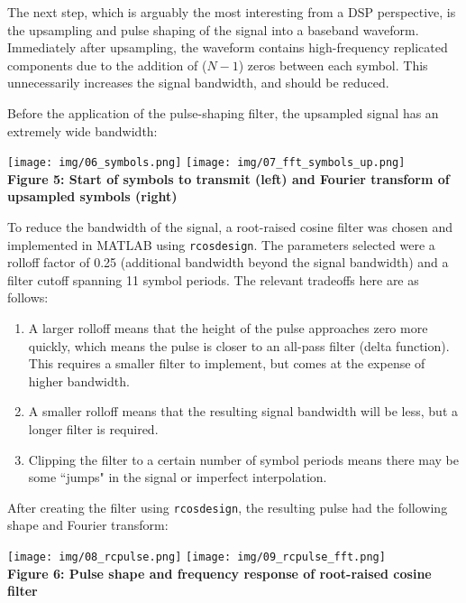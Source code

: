 \documentclass{article}
\begin{document}
The next step, which is arguably the most interesting from a DSP perspective,
is the upsampling and pulse shaping of the signal into a baseband waveform.
Immediately after upsampling, the waveform contains high-frequency replicated
components due to the addition of ($N - 1$) zeros between each symbol. This
unnecessarily increases the signal bandwidth, and should be reduced.

\vspace{6pt}

Before the application of the pulse-shaping filter, the upsampled signal
has an extremely wide bandwidth:

\begin{center}
  \texttt{[image: img/06\_symbols.png]} \hspace{6pt}
  \texttt{[image: img/07\_fft\_symbols\_up.png]} \\
  \textbf{Figure 5: Start of symbols to transmit (left) and Fourier transform of upsampled symbols (right)}
\end{center}

To reduce the bandwidth of the signal, a root-raised cosine filter was chosen
and implemented in MATLAB using \texttt{rcosdesign}. The parameters selected
were a rolloff factor of 0.25 (additional bandwidth beyond the signal
bandwidth) and a filter cutoff spanning 11 symbol periods. The relevant
tradeoffs here are as follows:

\begin{enumerate}
  \item A larger rolloff means that the height of the pulse approaches zero more quickly, which means the pulse is closer to an all-pass filter (delta function). This requires a smaller filter to implement, but comes at the expense of higher bandwidth.
  \item A smaller rolloff means that the resulting signal bandwidth will be less, but a longer filter is required.
  \item Clipping the filter to a certain number of symbol periods means there may be some ``jumps" in the signal or imperfect interpolation.
\end{enumerate}

After creating the filter using \texttt{rcosdesign}, the resulting pulse had
the following shape and Fourier transform:

\begin{center}
  \texttt{[image: img/08\_rcpulse.png]} \hspace{6pt}
  \texttt{[image: img/09\_rcpulse\_fft.png]} \\
  \textbf{Figure 6: Pulse shape and frequency response of root-raised cosine filter}
\end{center}
\end{document}
